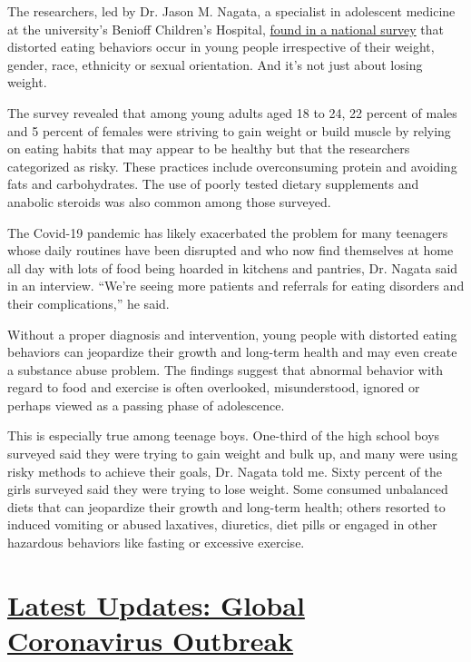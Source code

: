 The researchers, led by Dr. Jason M. Nagata, a specialist in adolescent
medicine at the university's Benioff Children's Hospital,
\href{https://onlinelibrary.wiley.com/doi/full/10.1002/eat.23094}{found
in a national survey} that distorted eating behaviors occur in young
people irrespective of their weight, gender, race, ethnicity or sexual
orientation. And it's not just about losing weight.

The survey revealed that among young adults aged 18 to 24, 22 percent of
males and 5 percent of females were striving to gain weight or build
muscle by relying on eating habits that may appear to be healthy but
that the researchers categorized as risky. These practices include
overconsuming protein and avoiding fats and carbohydrates. The use of
poorly tested dietary supplements and anabolic steroids was also common
among those surveyed.

The Covid-19 pandemic has likely exacerbated the problem for many
teenagers whose daily routines have been disrupted and who now find
themselves at home all day with lots of food being hoarded in kitchens
and pantries, Dr. Nagata said in an interview. ``We're seeing more
patients and referrals for eating disorders and their complications,''
he said.

Without a proper diagnosis and intervention, young people with distorted
eating behaviors can jeopardize their growth and long-term health and
may even create a substance abuse problem. The findings suggest that
abnormal behavior with regard to food and exercise is often overlooked,
misunderstood, ignored or perhaps viewed as a passing phase of
adolescence.

This is especially true among teenage boys. One-third of the high school
boys surveyed said they were trying to gain weight and bulk up, and many
were using risky methods to achieve their goals, Dr. Nagata told me.
Sixty percent of the girls surveyed said they were trying to lose
weight. Some consumed unbalanced diets that can jeopardize their growth
and long-term health; others resorted to induced vomiting or abused
laxatives, diuretics, diet pills or engaged in other hazardous behaviors
like fasting or excessive exercise.

\hypertarget{latest-updates-global-coronavirus-outbreak}{%
\section{\texorpdfstring{\href{https://www.nytimes3xbfgragh.onion/2020/08/01/world/coronavirus-covid-19.html?action=click\&pgtype=Article\&state=default\&region=MAIN_CONTENT_1\&context=storylines_live_updates}{Latest
Updates: Global Coronavirus
Outbreak}}{Latest Updates: Global Coronavirus Outbreak}}\label{latest-updates-global-coronavirus-outbreak}}

